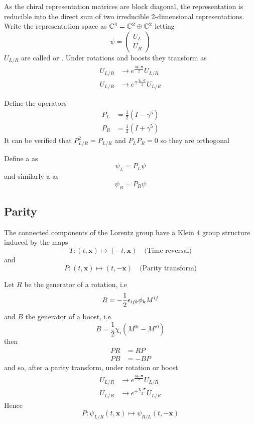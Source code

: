\documentclass{article}
\begin{document}
\begin{definition}
As the chiral representation matrices are block diagonal, the representation is reducible into the direct sum of two irreducible 2-dimensional representations. Write the representation space as $\mathbb{C}^4=\mathbb{C}^2\oplus\mathbb{C}^2$ letting 
\[
\psi=\begin{pmatrix} U_L \\ U_R \end{pmatrix}
\]
$U_{L/R}$ are called  or . Under rotations and boosts they transform as 
\begin{align*}
    U_{L/R} &\to e^{\frac{i\bm{\phi}\cdot\bm{\sigma}}{2}} U_{L/R} \\ 
    U_{L/R} &\to e^{\mp\frac{\bm{\chi}\cdot\bm{\sigma}}{2}} U_{L/R}
\end{align*}
\end{definition}

\begin{definition}
Define the operators 
\begin{align*}
    P_L &= \frac{1}{2}(I-\gamma^5) \\
    P_R &= \frac{1}{2}(I+\gamma^5) 
\end{align*}
It can be verified that $P_{L/R}^2=P_{L/R}$ and $P_L P_R =0$ so they are orthogonal 
\end{definition}

\begin{definition}
Define a  as 
\[
\psi_L=P_L \psi
\]
and similarly a  as 
\[
\psi_R=P_R \psi
\]
\end{definition}

\subsection{Parity}

\begin{fact}
The connected components of the Lorentz group have a Klein 4 group structure induced by the maps 
\[
T: (t,\bm{x}) \mapsto (-t,\bm{x}) \quad \text{(Time reversal)}
\]
and
\[
P: (t,\bm{x}) \mapsto (t, -\bm{x}) \quad \text{(Parity transform)}
\]
\end{fact}
\begin{fact}
Let $R$ be the generator of a rotation, i.e 
\[
R=-\frac{1}{2}\epsilon_{ijk}\phi_k M^{ij}
\]
and $B$ the generator of a boost, i.e. 
\[
B=\frac{1}{2}\chi_i (M^{0i}-M^{i0})
\]
then
\begin{align*}
    PR &= RP \\
    PB &= -BP 
\end{align*}
and so, after a parity transform, under rotation or boost
\begin{align*}
    U_{L/R} &\to e^{\frac{i\bm{\phi}\cdot\bm{\sigma}}{2}} U_{L/R} \\ 
    U_{L/R} &\to e^{\pm\frac{\bm{\chi}\cdot\bm{\sigma}}{2}} U_{L/R}
\end{align*}
Hence 
\[
P:\psi_{L/R}(t,\bm{x}) \mapsto \psi_{R/L}(t,-\bm{x})
\]
\end{fact}
\end{document}
